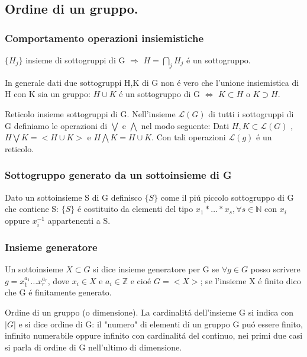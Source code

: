 \documentclass[oneside,12pt]{memoir}
\begin{document}
\subsection{Ordine di un gruppo.}

\subsubsection{Comportamento operazioni insiemistiche}

$\{ H_j \}$ insieme di sottogruppi di G $\Rightarrow$ $H=\bigcap_{j}H_j$ \'e un sottogruppo.

In generale dati due sottogruppi H,K di G non \'e vero che l'unione insiemistica di H con K sia un gruppo: $H\cup K$ \'e un sottogruppo di G $\iff$ $K\subset H$ o $K\supset H $.

\begin{definition}{Reticolo insieme sottogruppi di G.}
Nell'insieme $\mathcal{L}(G)$ di tutti i sottogruppi di G definiamo le operazioni di $\bigvee$ e $\bigwedge$ nel modo seguente:
Dati $H,K\subset \mathcal{L}(G)$ , $H\bigvee K=<H\cup K>$ e $H\bigwedge K=H\cup K$.
Con tali operazioni $\mathcal{L}(g)$ \'e un reticolo.
\end{definition}

\subsubsection{Sottogruppo generato da un sottoinsieme di G}
Dato un sottoinsieme S di G definisco $\{ S\}$ come il pi\'u piccolo sottogruppo di G che contiene S: $\{ S \}$ \'e costituito da elementi del tipo $x_1*\ldots *x_s , \forall s \in  \mathbb{N}$ con $x_i$ oppure $x_i^{-1}$ appartenenti a S.




\subsubsection{Insieme generatore}
Un sottoinsieme $X\subset G$ si dice insieme generatore per G se $\forall g \in G$ posso scrivere $g=x_1^{a_1}\ldots x_r^{a_r}$, dove $x_i \in X$ e $a_i \in \mathbb{Z}$ e cio\'e $G=<X>$; se l'insieme X \'e finito dico che G \'e finitamente generato.


\begin{definition}{Ordine di un gruppo (o dimensione).}
La cardinalit\'a dell'insieme G si indica con $|G|$ e si dice ordine di G: il "numero" di elementi di un gruppo G pu\'o essere finito, infinito numerabile oppure infinito con cardinalit\'a del continuo, nei primi due casi si parla di ordine di G nell'ultimo di dimensione.
\end{definition}
\end{document}
